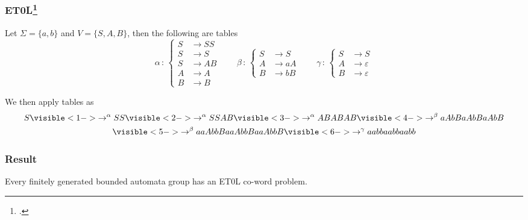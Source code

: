 \documentclass[11pt]{beamer}
\begin{document}
\begin{frame}
\frametitle{ET0L\footcite{rozenberg1973}}

\begin{example}
	Let $\Sigma = \{a,b\}$ and $V = \{S,A,B\}$, then the following are tables
	\[
	\alpha \, : \,
	\left\{
	\begin{aligned}
	S &\to SS\\
	S &\to S\\
	S &\to AB\\
	A &\to A\\
	B &\to B
	\end{aligned}
	\right.
	\qquad
	\beta \, : \,
	\left\{
	\begin{aligned}
	S &\to S\\
	A &\to aA\\
	B &\to bB
	\end{aligned}
	\right.
	\qquad
	\gamma \, : \,
	\left\{
	\begin{aligned}
	S &\to S \\
	A &\to \varepsilon \\
	B &\to \varepsilon
	\end{aligned}
	\right.
	\]
\end{example}

We then apply tables as 
\begin{multline*}
	S
	\visible<1->{\to^\alpha SS}
	\visible<2->{\to^\alpha SS AB}
	\visible<3->{\to^\alpha AB AB AB}
	\visible<4->{\to^\beta  aA bB aA bB aA bB} \\
	\visible<5->{\to^\beta  aaA bbB aaA bbB aaA bbB}
	\visible<6->{\to^\gamma aa bb aa bb aa bb}
\end{multline*}


\end{frame}




\begin{frame}
\frametitle{Result}

\begin{theorem}[B, Elder]
	Every finitely generated bounded automata group has an ET0L co-word problem.
\end{theorem}

\end{frame}
\end{document}
